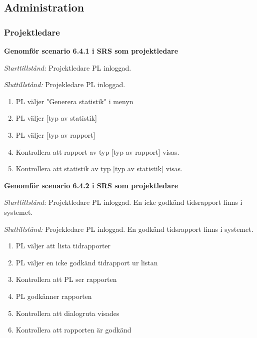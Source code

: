 \documentclass[a4paper]{article}
\begin{document}
\begin{ST}
\begin{enumerate}
\end{enumerate}

\end{ST}




\subsection{Administration}

\subsubsection{Projektledare}
\begin{ST}

\item
\textbf{Genomför scenario 6.4.1 i SRS som projektledare}

\emph{Starttillstånd:} Projektledare PL inloggad.

\emph{Sluttillstånd:} Projekledare PL inloggad.

\begin{enumerate}
\item
PL väljer "Generera statistik" i menyn
\item
PL väljer [typ av statistik]
\item 
PL väljer [typ av rapport]
\item
Kontrollera att rapport av typ [typ av rapport] visas.
\item
Kontrollera att statistik av typ [typ av statistik] visas.
\end{enumerate}

\item
\textbf{Genomför scenario 6.4.2 i SRS som projektledare}

\emph{Starttillstånd:} Projektledare PL inloggad. En icke godkänd tidsrapport finns i systemet.

\emph{Sluttillstånd:} Projekledare PL inloggad. En godkänd tidsrapport finns i systemet.

\begin{enumerate}

\item
PL väljer att lista tidrapporter
\item
PL väljer en icke godkänd tidrapport ur listan
\item
Kontrollera att PL ser rapporten
\item
PL godkänner rapporten
\item
Kontrollera att dialogruta visades
\item
Kontrollera att rapporten är godkänd


\end{enumerate}
\end{ST}
\end{document}
